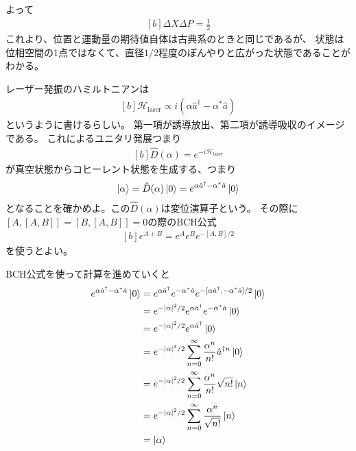 \documentclass[../../master.tex]{subfiles}
\begin{document}
よって
\begin{equation}\begin{aligned}[b]
    \Delta X \Delta P = \frac{1}{2}
\end{aligned}\end{equation}
これより、位置と運動量の期待値自体は古典系のときと同じであるが、
状態は位相空間の1点ではなくて、直径\(1/2\)程度のぼんやりと広がった状態であることがわかる。
\newline
\begin{tcolorbox}[colbacktitle=white, coltitle=black, colback=white, title=おまけ2]
    レーザー発振のハミルトニアンは
    \begin{equation}\begin{aligned}[b]
        \mathcal{H}_{\text{laser}} \propto i(\alpha\hat{a}^\dagger-\alpha^* \hat{a})
    \end{aligned}\end{equation}
    というように書けるらしい。
    第一項が誘導放出、第二項が誘導吸収のイメージである。
    これによるユニタリ発展つまり
    \begin{equation}\begin{aligned}[b]
        \hat{D}(\alpha) = e^{-i\mathcal{H}_{\text{laser}}}
    \end{aligned}\end{equation}
    が真空状態からコヒーレント状態を生成する、つまり
    \begin{equation}\begin{aligned}[b]
        \ket{\alpha} = \hat{D}(\alpha)\ket{0} =e^{\alpha\hat{a}^\dagger-\alpha^* \hat{a}}\ket{0}
    \end{aligned}\end{equation}
    となることを確かめよ。この\(\hat{D}(\alpha)\)は変位演算子という。
    その際に\([A,[A,B]]=[B,[A,B]]=0\)の際のBCH公式
    \begin{equation}\begin{aligned}[b]
        e^{A+B}=e^{A}e^{B}e^{-[A,B]/2}
    \end{aligned}\end{equation}
    を使うとよい。
\end{tcolorbox}
BCH公式を使って計算を進めていくと
\begin{equation}\begin{aligned}[b]
    e^{\alpha\hat{a}^\dagger-\alpha^* \hat{a}}\ket{0}
    &= e^{\alpha\hat{a}^\dagger} e^{-\alpha^*\hat{a}}e^{-[\alpha \hat{a}^\dagger,-\alpha^*\hat{a}]/2}\ket{0}\\
    &= e^{-\abs{\alpha}^2/2}e^{\alpha\hat{a}^\dagger} e^{-\alpha^*\hat{a}}\ket{0}\\
    &= e^{-\abs{\alpha}^2/2}e^{\alpha\hat{a}^\dagger}\ket{0}\\
    &= e^{-\abs{\alpha}^2/2}\sum_{n=0}^{\infty}\frac{\alpha^n}{n!}\hat{a}^{\dagger n}\ket{0}\\
    &= e^{-\abs{\alpha}^2/2}\sum_{n=0}^{\infty}\frac{\alpha^n}{n!}\sqrt{n!}\ket{n}\\
    &= e^{-\abs{\alpha}^2/2}\sum_{n=0}^{\infty}\frac{\alpha^n}{\sqrt{n!}}\ket{n}\\
    &= \ket{\alpha}
\end{aligned}\end{equation}
\end{document}
